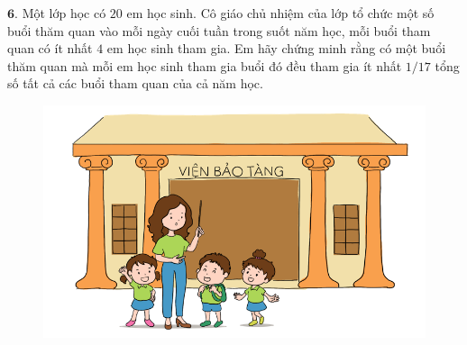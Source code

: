 \begin{multicols}{2}
\begin{figure}[H]
		\vspace*{-10pt}
	\end{figure}
	$\pmb{6.}$ Một lớp học có $20$ em học sinh. Cô giáo chủ nhiệm của lớp tổ chức một số buổi thăm quan vào mỗi ngày cuối tuần trong suốt năm học, mỗi buổi tham quan có ít nhất $4$ em học sinh tham gia. Em hãy chứng minh rằng có một buổi thăm quan mà mỗi em học sinh tham gia buổi đó đều tham gia ít nhất $1/17$ tổng số tất cả các buổi tham quan của cả năm học.
	\begin{figure}[H]
		\centering
		\vspace*{-15pt}
		\captionsetup{labelformat= empty, justification=centering}
		\includegraphics[width=0.8\linewidth]{Pi5_bai6}
	\end{figure}
\end{multicols}
\newpage
\begingroup
{} 
